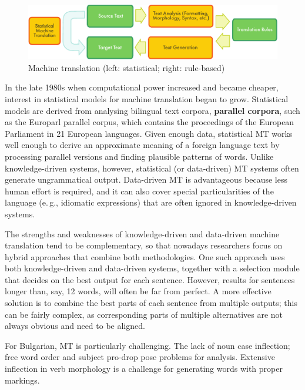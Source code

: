 \begin{multicols}{2}
  \begin{figure}[htb]
    \center
    \includegraphics[width=\textwidth]{../_media/english/machine_translation}
    \caption{Machine translation (left: statistical; right: rule-based)}
    \label{fig:mtarch_en}
  \end{figure}

  In the late 1980s when computational power increased and became cheaper, interest in statistical models for machine translation began to grow. Statistical models are derived from analysing bilingual text corpora, \textbf{parallel corpora}, such as the Europarl parallel corpus, which contains the proceedings of the European Parliament in 21 European languages. Given enough data, statistical MT works well enough to derive an approximate meaning of a foreign language text by processing parallel versions and finding plausible patterns of words. Unlike knowledge-driven systems, however, statistical (or data-driven) MT systems often generate ungrammatical output. Data-driven MT is advantageous because less human effort is required, and it can also cover special particularities of the language (e.\,g., idiomatic expressions) that are often ignored in knowledge-driven systems. 

  The strengths and weaknesses of knowledge-driven and data-driven machine translation tend to be complementary, so that nowadays researchers focus on hybrid approaches that combine both methodologies. One such approach uses both knowledge-driven and data-driven systems, together with a selection module that decides on the best output for each sentence. However, results for sentences longer than, say, 12 words, will often be far from perfect. A more effective solution is to combine the best parts of each sentence from multiple outputs; this can be fairly complex, as corresponding parts of multiple alternatives are not always obvious and need to be aligned. 


  For Bulgarian, MT is particularly challenging. The lack of noun case inflection; free word order and subject pro-drop pose problems for analysis. Extensive inflection in verb morphology is a challenge for generating words with proper markings. 


\end{multicols}
